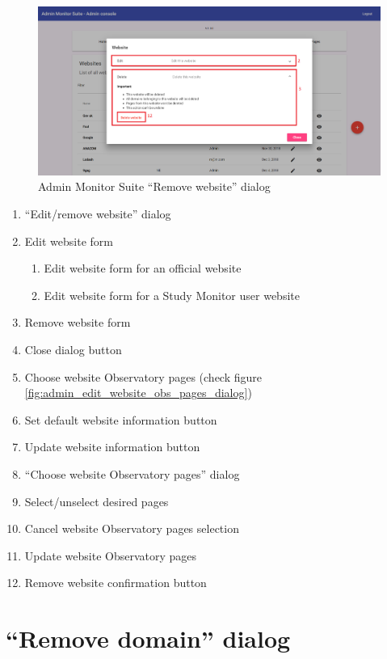 \begin{figure}[H]
    \centering
    \includegraphics[width=\linewidth]{lib/images/admin/admin_remove_website_dialog.png}
    \caption{Admin Monitor Suite ``Remove website'' dialog}
    \label{fig:admin_remove_website_dialog}
\end{figure}

\begin{enumerate}
    \item ``Edit/remove website'' dialog
    \item Edit website form
    \begin{enumerate}
        \item Edit website form for an official website
        \item Edit website form for a Study Monitor user website
    \end{enumerate}
    \item Remove website form
    \item Close dialog button
    \item Choose website Observatory pages (check figure \ref{fig:admin_edit_website_obs_pages_dialog})
    \item Set default website information button
    \item Update website information button
    \item ``Choose website Observatory pages'' dialog
    \item Select/unselect desired pages
    \item Cancel website Observatory pages selection
    \item Update website Observatory pages
    \item Remove website confirmation button
\end{enumerate}

\section{``Remove domain'' dialog}
\label{sec:admin_remove_domain_dialog}

